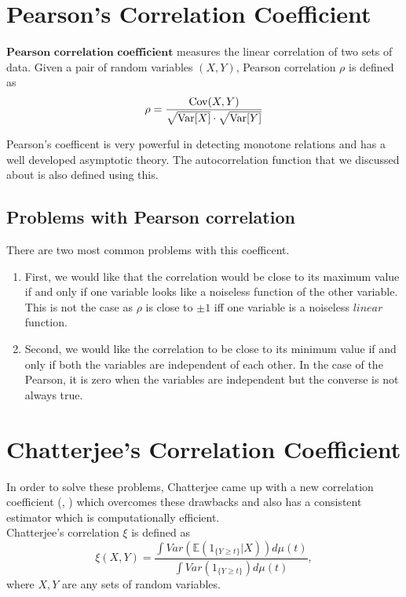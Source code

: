 \documentclass{article}
\begin{document}
\section{Pearson's Correlation Coefficient}
	$\textbf{Pearson correlation coefficient}$ measures the linear correlation of two sets of data.
	Given a pair of random variables $(X, Y)$, Pearson correlation $\rho$ is defined as
	$$\rho = \frac{\text{Cov}(X, Y)}{\sqrt{\text{Var}[X]} \cdot \sqrt{\text{Var}[Y]}}$$

	Pearson's coefficent is very powerful in detecting monotone relations and
	has a well developed asymptotic theory. The autocorrelation function that we discussed about is also defined using this.

	\subsection{Problems with Pearson correlation}
		There are two most common problems with this coefficent.
		\begin{enumerate}
			\item First, we would like that the correlation would be close to its maximum value
			if and only if one variable looks like a noiseless function of the other variable.
			This is not the case as $\rho$ is close to $\pm 1$ iff one variable is a noiseless $\textit{linear}$ function.
			\item Second, we would like the correlation to be close to its minimum value if and only if both the variables are independent of each other.
			In the case of the Pearson, it is zero when the variables are independent but the converse is not always true.
		\end{enumerate}

\section{Chatterjee's Correlation Coefficient}
	In order to solve these problems, Chatterjee came up with a new correlation coefficient (\cite{chatterjee2020sourav}, \cite{chatterjee2021mona}) which overcomes these drawbacks and also has a consistent estimator which is computationally efficient.\\
	Chatterjee's correlation $\xi$ is defined as
	$$\xi(X, Y) = \frac{\int Var(\mathbb{E}(1_{\{Y \geq t\}}|X)) d\mu(t)}{\int Var(1_{\{Y \geq t\}}) d\mu(t)},$$
	where $X, Y$ are any sets of random variables.
\end{document}
